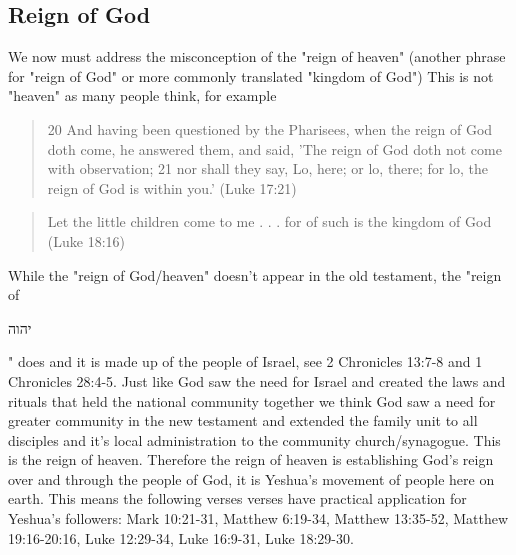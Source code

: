 \documentclass[11pt]{article}
\begin{document}
\subsection{Reign of God} 
We now must address the misconception of the "reign of heaven" (another phrase for "reign of God" or more commonly translated "kingdom of God") This is not "heaven" as many people think, for example 
\begin{quote}
20 And having been questioned by the Pharisees, when the reign of God doth come, he answered them, and said, 'The reign of God doth not come with observation; 21 nor shall they say, Lo, here; or lo, there; for lo, the reign of God is within you.' (Luke 17:21) 
\end{quote}
\begin{quote}
Let the little children come to me . . . for of such is the kingdom of God (Luke 18:16) 
\end{quote}
While the "reign of God/heaven" doesn't appear in the old testament, the "reign of\begin{hebrew} יהוה\end{hebrew}" does and it is made up of the people of Israel, see 2 Chronicles 13:7-8 and 1 Chronicles 28:4-5. Just like God saw the need for Israel and created the laws and rituals that held the national community together we think God saw a need for greater community in the new testament and extended the family unit to all disciples and it's local administration to the community church/synagogue. This is the reign of heaven. Therefore the reign of heaven is establishing God's reign over and through the people of God, it is Yeshua's movement of people here on earth. \cite{kh} This means the following verses verses have practical application for Yeshua's followers:  Mark 10:21-31, Matthew 6:19-34, Matthew 13:35-52, Matthew 19:16-20:16, Luke 12:29-34, Luke 16:9-31, Luke 18:29-30. 
\end{document}
